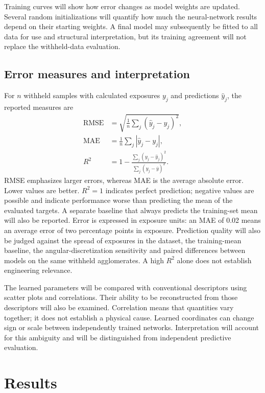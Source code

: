 \documentclass[11pt,a4paper]{article}
\begin{document}
Training curves will show how error changes as model weights are updated. Several random initializations will quantify how much the neural-network results depend on their starting weights. A final model may subsequently be fitted to all data for use and structural interpretation, but its training agreement will not replace the withheld-data evaluation.

\subsection{Error measures and interpretation}
For $n$ withheld samples with calculated exposures $y_j$ and predictions $\widehat y_j$, the reported measures are
\begin{align}
 \mathrm{RMSE}&=\sqrt{\frac{1}{n}\sum_j(\widehat y_j-y_j)^2},\\
 \mathrm{MAE}&=\frac{1}{n}\sum_j|\widehat y_j-y_j|,\\
 R^2&=1-\frac{\sum_j(y_j-\widehat y_j)^2}{\sum_j(y_j-\overline y)^2}.
\end{align}
RMSE emphasizes larger errors, whereas MAE is the average absolute error. Lower values are better. $R^2=1$ indicates perfect prediction; negative values are possible and indicate performance worse than predicting the mean of the evaluated targets. A separate baseline that always predicts the training-set mean will also be reported. Error is expressed in exposure units: an MAE of 0.02 means an average error of two percentage points in exposure. Prediction quality will also be judged against the spread of exposures in the dataset, the training-mean baseline, the angular-discretization sensitivity and paired differences between models on the same withheld agglomerates. A high $R^2$ alone does not establish engineering relevance.

The learned parameters will be compared with conventional descriptors using scatter plots and correlations. Their ability to be reconstructed from those descriptors will also be examined. Correlation means that quantities vary together; it does not establish a physical cause. Learned coordinates can change sign or scale between independently trained networks. Interpretation will account for this ambiguity and will be distinguished from independent predictive evaluation.

\section{Results}
\end{document}

